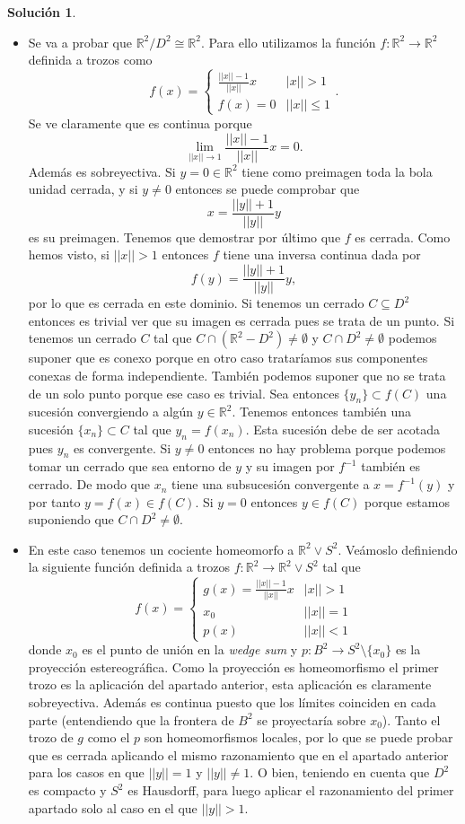 \documentclass{article}
\theoremstyle{plain}
\theoremstyle{definition}
\newtheorem*{sol*}{Solución}
\newcommand{\R}{\mathbb{R}}
\begin{document}
\begin{sol*}
\begin{itemize}\
	\item Se va a probar que $\mathbb{R}^2/D^2\cong\R^2$. Para ello utilizamos la función $f:\mathbb{R}^2\to\mathbb{R}^2$ definida a trozos como 
\[f(x)=\begin{cases}
\frac{||x||-1}{||x||}x & |x||>1\\
f(x)=0 & ||x||\leq 1
\end{cases}.
\] 
Se ve claramente que es continua porque $$\lim_{||x||\to 1}\frac{||x||-1}{||x||}x=0.$$
Además es sobreyectiva. Si $y=0\in\R^2$ tiene como preimagen toda la bola unidad cerrada, y si $y\neq 0$ entonces se puede comprobar que $$x=\frac{||y||+1}{||y||}y$$ es su preimagen. Tenemos que demostrar por último que $f$ es cerrada. Como hemos visto, si $||x||>1$ entonces $f$ tiene una inversa continua dada por $$f(y)=\frac{||y||+1}{||y||}y,$$ por lo que es cerrada en este dominio. Si tenemos un cerrado $C\subseteq D^2$ entonces es trivial ver que su imagen es cerrada pues se trata de un punto. Si tenemos un cerrado $C$ tal que $C\cap(\mathbb{R}^2-D^2)\neq\emptyset$ y $C\cap D^2\neq\emptyset$ podemos suponer que es conexo porque en otro caso trataríamos sus componentes conexas de forma independiente. También podemos suponer que no se trata de un solo punto porque ese caso es trivial. Sea entonces $\{y_n\}\subset f(C)$ una sucesión convergiendo a algún $y\in\R^2$. Tenemos entonces también una sucesión $\{x_n\}\subset C$ tal que $y_n=f(x_n)$. Esta sucesión debe de ser acotada pues $y_n$ es convergente. Si $y\neq 0$ entonces no hay problema porque podemos tomar un cerrado que sea entorno de $y$ y su imagen por $f^{-1}$ también es cerrado. De modo que $x_n$ tiene una subsucesión convergente a $x=f^{-1}(y)$ y por tanto $y=f(x)\in f(C)$. Si $y=0$ entonces $y\in f(C)$ porque estamos suponiendo que $C\cap D^2\neq\emptyset$.
	\item En este caso tenemos un cociente homeomorfo a $\R^2\vee S^2$. Veámoslo definiendo la siguiente función definida a trozos $f:\R^2\to\R^2\vee S^2$ tal que
	\[
	f(x)=\begin{cases}
	g(x)=\frac{||x||-1}{||x||}x & |x||>1\\
	x_0 & ||x||=1\\
	p(x) & ||x||<1
	\end{cases}
	\]
	donde $x_0$ es el punto de unión en la \emph{wedge sum} y $p:B^2\to S^2\setminus\{x_0\}$ es la proyección estereográfica. Como la proyección es homeomorfismo el primer trozo es la aplicación del apartado anterior, esta aplicación es claramente sobreyectiva. Además es continua puesto que los límites coinciden en cada parte (entendiendo que la frontera de $B^2$ se proyectaría sobre $x_0$). Tanto el trozo de $g$ como el $p$ son homeomorfismos locales, por lo que se puede probar que es cerrada aplicando el mismo razonamiento que en el apartado anterior para los casos en que $||y||=1$ y $||y||\neq 1$. O bien, teniendo en cuenta que $D^2$ es compacto y $S^2$ es Hausdorff, para luego aplicar el razonamiento del primer apartado solo al caso en el que $||y||>1$. 

\end{itemize}
\end{sol*}
\end{document}

